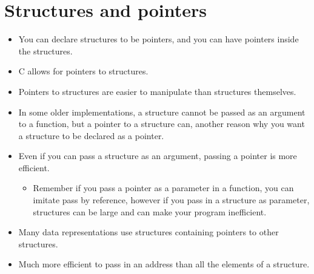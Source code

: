 \section{Structures and pointers}
\begin{itemize}
    \item You can declare structures to be pointers, and you can have pointers inside the structures.
    \item C allows for pointers to structures.
    \item Pointers to structures are easier to manipulate than structures themselves.
    \item In some older implementations, a structure cannot be passed as an argument to a function, but a pointer to a structure can, another reason why you want a structure to be declared as a pointer. 
    \item Even if you can pass a structure as an argument, passing a pointer is more efficient.
        \begin{itemize}
            \item Remember if you pass a pointer as a parameter in a function, you can imitate pass by reference, however if you pass in a structure as parameter, structures can be large and can make your program inefficient. 
        \end{itemize}
    \item Many data representations use structures containing pointers to other structures. 
    \item Much more efficient to pass in an address than all the elements of a structure. 
\end{itemize}


